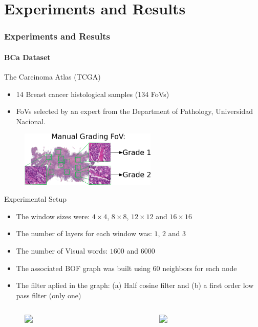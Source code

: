 \documentclass[usenames,dvipsnames]{beamer}
\begin{document}
\section{Experiments and Results}

\begin{frame}

\frametitle{Experiments and Results}
\framesubtitle{BCa Dataset}
\centering
\footnotesize \begin{block}{The Carcinoma Atlas (TCGA)}
\begin{itemize}
\item 14 Breast cancer histological samples (134 FoVs)
\item FoVs selected by an expert from the Department of Pathology, Universidad Nacional.
\end{itemize}
\end{block}
\begin{figure}
\includegraphics[width=6.5cm]{imagenes/fov.png}
\end{figure}
\end{frame}

\begin{frame}{Experimental Setup}
\footnotesize\begin{itemize}
\item The window sizes were: $4\times4$, $8\times8$, $12\times12$ and $16\times16$
\pause
\item The number of layers for each window was: $1$, $2$ and $3$
\pause
\item The number of Visual words: $1600$ and $6000$ 
\pause
\item The associated BOF graph was built using $60$ neighbors for each node
\pause
\item The filter aplied in the graph:  (a) Half cosine filter   and (b) a first order low pass filter (only one)
\end{itemize}
\vspace{-1cm}
\begin{columns}[t, totalwidth=1\textwidth]
\begin{column}{0.5\textwidth}
\begin{figure}
\includegraphics<5->[width=0.9\textwidth]{imagenes/cosine_filter.png}
\end{figure}
\vspace{-0.5cm}\centering\small{}
\end{column}
\begin{column}{0.5\textwidth}        
\begin{figure}
\includegraphics<6->[width=0.9\textwidth]{imagenes/lowpass_filter.png}
\end{figure}
\vspace{-0.5cm}\centering\small{}
\end{column}        
\end{columns}
\end{frame}
\end{document}
